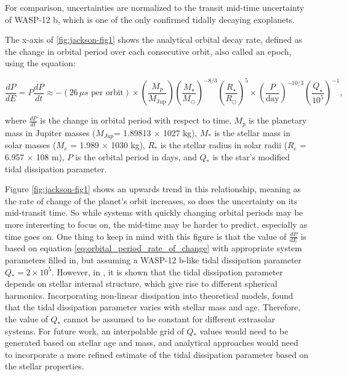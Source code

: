 \documentclass[oneside,12pt]{amsart}
\numberwithin{page}{section}
\begin{document}
For comparison, uncertainties are normalized to the transit mid-time uncertainty of WASP-12 b, which is one of the only confirmed tidally decaying exoplanets. 

The x-axis of \ref{fig:jackson-fig1} shows the analytical orbital decay rate, defined as the change in orbital period over each consecutive orbit, also called an epoch, using the equation: 

\begin{equation}
    \frac{dP}{dE} = P \frac{dP}{dt} \approx - (26 \, \mu s \text{ per orbit})
    \times \left( \frac{M_p}{M_{\text{Jup}}} \right)
    \left( \frac{M_\star}{M_\odot} \right)^{-8/3}
    \left( \frac{R_\star}{R_\odot} \right)^{5}
    \times \left( \frac{P}{\text{day}} \right)^{-10/3}
    \left( \frac{Q_\star}{10^5} \right)^{-1},
    \label{eq:orbital_period_rate_of_change}
\end{equation}

where $\frac{dP}{dt}$ is the change in orbital period with respect to time, $M_p$ is the planetary mass in Jupiter masses ($M_{Jup}$=
1.89813 × 1027 kg), $M_*$ is the stellar mass in solar masses
($M_e$ = 1.989 × 1030 kg), $R_*$ is the stellar radius in solar radii ($R_e$ = 6.957 × 108 m), $P$ is the orbital period in days, and $Q_*$ is the star’s modified tidal dissipation parameter.

Figure \ref{fig:jackson-fig1} shows an upwards trend in this relationship, meaning as the rate of change of the planet's orbit increases, so does the uncertainty on its mid-transit time. So while systems with quickly changing orbital periods may be more interesting to focus on, the mid-time may be harder to predict, especially as time goes on. One thing to keep in mind with this figure is that the value of $\frac{dP}{dE}$ is based on equation \ref{eq:orbital_period_rate_of_change} with appropriate system parameters filled in, but assuming a WASP-12 b-like tidal dissipation parameter $Q_* = 2 \times 10^5$. However, in \citet{ogilvie2014tidal}, it is shown that the tidal dissipation parameter depends on stellar internal structure, which give rise to different spherical harmonics. Incorporating non-linear dissipation into theoretical models, \citet{weinberg2023orbital} found that the tidal dissipation parameter varies with stellar mass and age. Therefore, the value of $Q_*$ cannot be assumed to be constant for different extrasolar systems. For future work, an interpolable grid of $Q_*$ values would need to be generated based on stellar age and mass, and analytical approaches would need to incorporate a more refined estimate of the tidal dissipation parameter based on the stellar properties.
\end{document}
